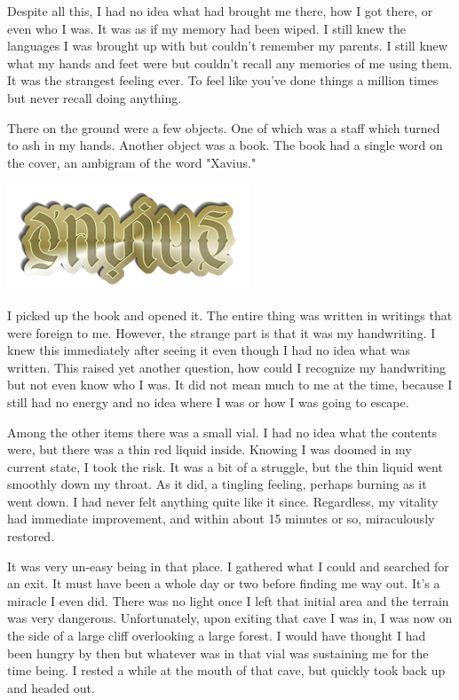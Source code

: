 \documentclass[11pt]{article}
\begin{document}
Despite all this, I had no idea what had brought me there, how I got there, or even who I was. It was as if my memory had been wiped. I still knew the languages I was brought up with but couldn't remember my parents. I still knew what my hands and feet were but couldn't recall any memories of me using them. It was the strangest feeling ever. To feel like you've done things a million times but never recall doing anything. 

There on the ground were a few objects. One of which was a staff which turned to ash in my hands. Another object was a book. The book had a single word on the cover, an ambigram of the word "Xavius."

\begin{center}
	\includegraphics[]{./ambigram.png}
\end{center}

I picked up the book and opened it. The entire thing was written in writings that were foreign to me. However, the strange part is that it was my handwriting. I knew this immediately after seeing it even though I had no idea what was written. This raised yet another question, how could I recognize my handwriting but not even know who I was. It did not mean much to me at the time, because I still had no energy and no idea where I was or how I was going to escape.

Among the other items there was a small vial. I had no idea what the contents were, but there was a thin red liquid inside. Knowing I was doomed in my current state, I took the risk. It was a bit of a struggle, but the thin liquid went smoothly down my throat. As it did, a tingling feeling, perhaps burning as it went down. I had never felt anything quite like it since. Regardless, my vitality had immediate improvement, and within about 15 minutes or so, miraculously restored. 

It was very un-easy being in that place. I gathered what I could and searched for an exit. It must have been a whole day or two before finding me way out. It's a miracle I even did. There was no light once I left that initial area and the terrain was very dangerous. Unfortunately, upon exiting that cave I was in, I was now on the side of a large cliff overlooking a large forest. I would have thought I had been hungry by then but whatever was in that vial was sustaining me for the time being. I rested a while at the mouth of that cave, but quickly took back up and headed out.
\end{document}
